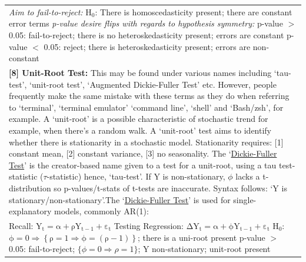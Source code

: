 \documentclass[11pt, english]{article}
\begin{document}
\begin{center}
\begin{longtable}{p{14cm}}
                \textit{Aim to fail-to-reject:}\newline
                H$_0$: There is homoscedasticity present; there are constant error terms\newline\newline
                \textit{p-value desire flips with regards to hypothesis symmetry:}\newline
                p-value $>$ 0.05: fail-to-reject; there is no heteroskedasticity present; errors are constant\newline
                p-value $<$ 0.05: reject; there is heteroskedasticity present; errors are non-constant\\
                \textbf{[8] Unit-Root Test: }This may be found under various names including `tau-test’, `unit-root test’, `Augmented Dickie-Fuller Test’ etc. However, people frequently make the same mistake with these terms as they do when referring to `terminal’, `terminal emulator’ `command line’, `shell’ and `Bash/zsh’, for example.\newline\newline
                A `unit-root’ is a possible characteristic of stochastic trend for example, when there’s a random walk. A `unit-root’ test aims to identify whether there is stationarity in a stochastic model. Stationarity requires: [1] constant mean, [2] constant variance, [3] no seasonality. The `\underline{Dickie-Fuller Test}' is the creator-based name given to a test for a unit-root, using a tau test-statistic ($\tau$-statistic) hence, `tau-test’. If Y is non-stationary, $\phi$ lacks a t-distribution so p-values/t-stats of t-tests are inaccurate. Syntax follows: `Y is stationary/non-stationary’.\newline\newline
                [8.1] The `\underline{Dickie-Fuller Test}' is used for single-explanatory models, commonly AR(1):\\
                Recall: $\mathrm{Y_t=\alpha+\rho Y_{t-1}+\varepsilon_t}$\newline
                Testing Regression: $\mathrm{\Delta Y_t=\alpha+\phi Y_{t-1}+\varepsilon_t}$\newline\newline
                H$_0$: $\mathrm{\phi=0\Rightarrow\left\{\rho=1\Rightarrow\phi=(\rho-1)\right\}}$; there is a uni-root present\newline\newline
                p-value $>$ 0.05: fail-to-reject; $\{\phi=0\Rightarrow\rho=1\}$; Y non-stationary; unit-root present\newline

\end{longtable}
\end{center}
\end{document}
